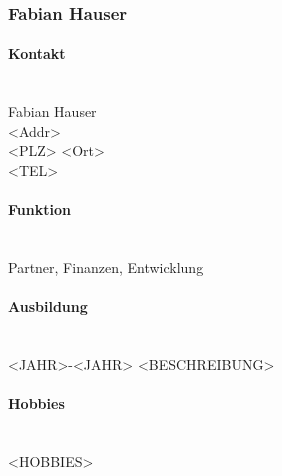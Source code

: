 \subsubsection{Fabian Hauser}
\noindent\begin{minipage}{0.7\textwidth}
	\paragraph{Kontakt} \hfill \\
	Fabian Hauser \\
	<Addr> \\
	<PLZ> <Ort> \\
	<TEL> \\
	
	\paragraph{Funktion} \hfill \\
	Partner, Finanzen, Entwicklung \\
	
	\paragraph{Ausbildung} \hfill \\
	<JAHR>-<JAHR> \hspace{2cm} <BESCHREIBUNG> \\
	
	\paragraph{Hobbies} \hfill \\
	<HOBBIES> \\
\end{minipage}
\hfill
